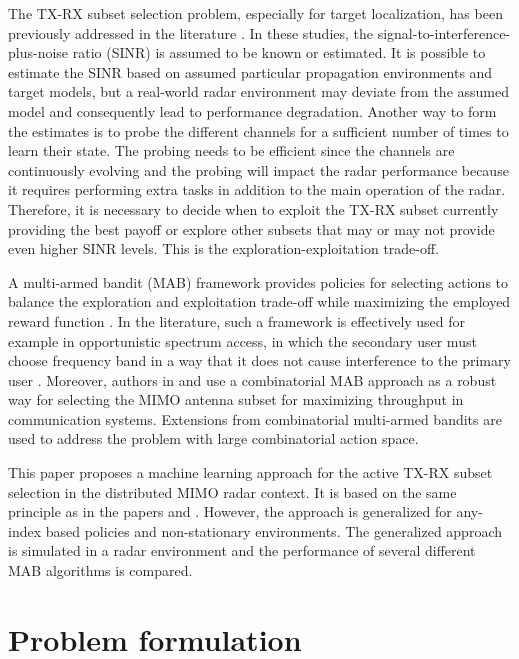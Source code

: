 \documentclass[conference]{IEEEtran}
\begin{document}
The TX-RX subset selection problem, especially for target localization, has been previously addressed in the literature \cite{Godrich2011, Sun2014}.
In these studies, the signal-to-interference-plus-noise ratio (SINR) is assumed to be known or estimated.
It is possible to estimate the SINR based on assumed particular propagation environments and target models, but a real-world radar environment may deviate from the assumed model and consequently lead to performance degradation.
Another way to form the estimates is to probe the different channels for a sufficient number of times to learn their state. 
The probing needs to be efficient since the channels are continuously evolving and the probing will impact the radar performance because it requires performing extra tasks in addition to the main operation of the radar.  Therefore, it is necessary to decide when to exploit the TX-RX subset currently providing the best payoff or explore other subsets that may or may not provide even higher SINR levels. 
This is the exploration-exploitation trade-off.

A multi-armed bandit (MAB) framework provides policies for selecting actions to balance the exploration and exploitation trade-off while maximizing the employed reward function \cite{Lattimore2019}.
In the literature, such a framework is effectively used for example in opportunistic spectrum access, in which the secondary user must choose frequency band in a way that it does not cause interference to the primary user \cite{Zhao2008}.
Moreover, authors in \cite{Mukherjee2012} and \cite{Kuai2019} use a combinatorial MAB approach as a robust way for selecting the MIMO antenna subset for maximizing throughput in communication systems.
Extensions from combinatorial multi-armed bandits are used to address the problem with large combinatorial action space.

This paper proposes a machine learning approach for the active TX-RX subset selection in the distributed MIMO radar context.
It is based on the same principle as in the papers \cite{Mukherjee2012} and \cite{Kuai2019}. 
However, the approach is generalized for any-index based policies and non-stationary environments. 
The generalized approach is simulated in a radar environment and the performance of several different MAB algorithms is compared.


\section{Problem formulation}
\end{document}
